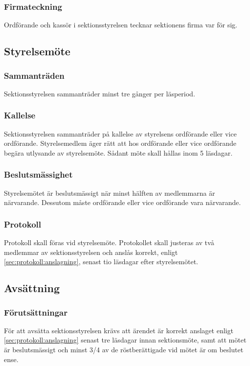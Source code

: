 \subsubsection{Firmateckning}
Ordförande och kassör i sektionsstyrelsen tecknar sektionens firma var för sig.

\subsection{Styrelsemöte}

\subsubsection{Sammanträden}
Sektionsstyrelsen sammanträder minst tre gånger per läsperiod.

\subsubsection{Kallelse}
Sektionsstyrelsen sammanträder på kallelse av styrelsens ordförande eller vice ordförande. Styrelsemedlem äger rätt att hos ordförande eller vice ordförande begära utlysande av styrelsemöte. Sådant möte skall hållas inom 5 läsdagar.

\subsubsection{Beslutsmässighet}
Styrelsemötet är beslutsmässigt när minst hälften av medlemmarna är närvarande. Dessutom måste ordförande eller vice ordförande vara närvarande.

\subsubsection{Protokoll}
Protokoll skall föras vid styrelsemöte. Protokollet skall justeras av två medlemmar av sektionsstyrelsen och anslås korrekt, enligt \ref{sec:protokoll:anslagning}, senast tio läsdagar efter styrelsemötet.

\subsection{Avsättning}

\subsubsection{Förutsättningar}
För att avsätta sektionsstyrelsen krävs att ärendet är korrekt anslaget enligt \ref{sec:protokoll:anslagning} senast tre läsdagar innan sektionsmöte, samt att mötet är beslutsmässigt och minst 3/4 av de röstberättigade vid mötet är om beslutet ense. 

